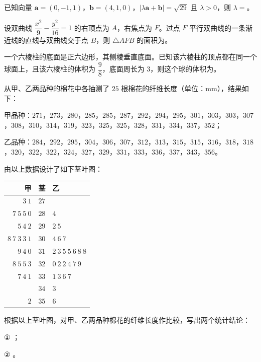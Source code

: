 \begin{question}
已知向量 $\boldsymbol a=(0,-1,1)$，$\boldsymbol b=(4,1,0)$，$|\lambda\boldsymbol a+\boldsymbol b|=\sqrt{29}$ 且 $\lambda>0$，则 $\lambda=$\gkblank{}。

\end{question}
\begin{question}
设双曲线 $\dfrac{x^2}9-\dfrac{y^2}{16}=1$ 的右顶点为 $A$，右焦点为 $F$。过点 $F$ 平行双曲线的一条渐近线的直线与双曲线交于点 $B$，则 $\triangle AFB$ 的面积为\gkblank{}。

\end{question}
\begin{question}
一个六棱柱的底面是正六边形，其侧棱垂直底面。已知该六棱柱的顶点都在同一个球面上，且该六棱柱的体积为 $\dfrac98$，底面周长为 $3$，则这个球的体积为\gkblank{}。

\end{question}
\begin{question}
从甲、乙两品种的棉花中各抽测了 $25$ 根棉花的纤维长度（单位：mm），结果如下：

甲品种：$271$，$273$，$280$，$285$，$285$，$287$，$292$，$294$，$295$，$301$，$303$，$303$，$307$，$308$，$310$，$314$，$319$，$323$，$325$，$325$，$328$，$331$，$334$，$337$，$352$；

乙品种：$284$，$292$，$295$，$304$，$306$，$307$，$312$，$313$，$315$，$315$，$316$，$318$，$318$，$320$，$322$，$322$，$324$，$327$，$329$，$331$，$333$，$336$，$337$，$343$，$356$。

由以上数据设计了如下茎叶图：

\begin{center}
\begin{tabular}{rcl}
\toprule
甲 & 茎 & 乙 \\
\midrule
$3\ 1$ & $27$ &  \\
$7\ 5\ 5\ 0$ & $28$ & $4$ \\
$5\ 4\ 2$ & $29$ & $2\ 5$ \\
$8\ 7\ 3\ 3\ 1$ & $30$ & $4\ 6\ 7$ \\
$9\ 4\ 0$ & $31$ & $2\ 3\ 5\ 5\ 6\ 8\ 8$ \\
$8\ 5\ 5\ 3$ & $32$ & $0\ 2\ 2\ 4\ 7\ 9$ \\
$7\ 4\ 1$ & $33$ & $1\ 3\ 6\ 7$ \\
 & $34$ & $3$ \\
$2$ & $35$ & $6$ \\
\bottomrule
\end{tabular}
\end{center}

根据以上茎叶图，对甲、乙两品种棉花的纤维长度作比较，写出两个统计结论：

① \gkblank{}；

② \gkblank{}。

\end{question}

